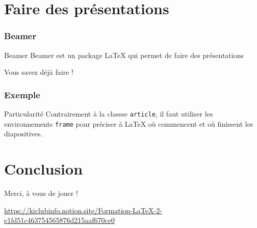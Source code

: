 \documentclass{beamer}
\begin{document}
    \section{Faire des présentations}
    \begin{frame}
        \frametitle{Beamer}
        \begin{block}{Beamer}
            Beamer est un package LaTeX qui permet de faire des présentations
        \end{block}
        \centering
        \Huge{Vous savez déjà faire !}
    \end{frame}
    \begin{frame}
        \frametitle{Exemple}
        \begin{alertblock}{Particularité}
            Contrairement à la classse \texttt{article}, il faut utiliser les environnements \texttt{frame} pour
            préciser à \LaTeX{} où commencent et où finissent les diapositives.
        \end{alertblock}

        
    \end{frame}
    \section*{Conclusion}
    \begin{frame}
        \centering
        \Huge Merci, à vous de jouer !
        
        \vspace{1cm}

        \normalsize\url{https://kiclubinfo.notion.site/Formation-LaTeX-2-e1fd51c463754565876d215aaf670ce0}

        \vspace{.5cm}
    \end{frame}
\end{document}

